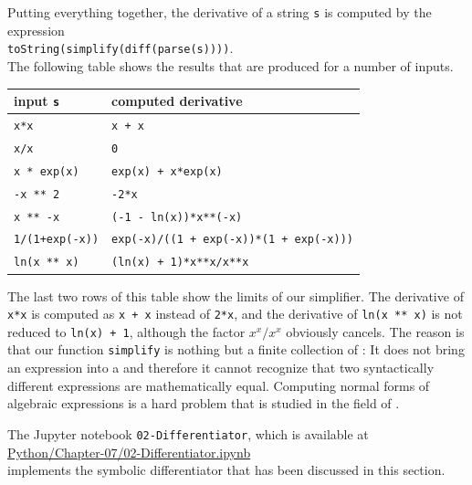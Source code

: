 \noindent
Putting everything together, the derivative of a string \texttt{s} is computed by the expression
\\[0.2cm]
\hspace*{1.3cm}
\texttt{toString(simplify(diff(parse(s))))}.
\\[0.2cm]
The following table shows the results that are produced for a number of inputs.
\begin{center}
\begin{tabular}{|l|l|}
\hline
\textbf{input \texttt{s}} & \textbf{computed derivative} \\
\hline
\texttt{x*x}           & \texttt{x + x}                                        \\
\texttt{x/x}           & \texttt{0}                                            \\
\texttt{x * exp(x)}    & \texttt{exp(x) + x*exp(x)}                            \\
\texttt{-x ** 2}       & \texttt{-2*x}                                         \\
\texttt{x ** -x}       & \texttt{(-1 - ln(x))*x**(-x)}                         \\
\texttt{1/(1+exp(-x))} & \texttt{exp(-x)/((1 + exp(-x))*(1 + exp(-x)))}        \\
\texttt{ln(x ** x)}    & \texttt{(ln(x) + 1)*x**x/x**x}                        \\
\hline
\end{tabular}
\end{center}

\remarkEng
The last two rows of this table show the limits of our simplifier.  The derivative of \texttt{x*x} is
computed as \texttt{x + x} instead of \texttt{2*x}, and the derivative of \texttt{ln(x ** x)} is not
reduced to \texttt{ln(x) + 1}, although the factor $x^x/x^x$ obviously cancels.  The reason is that our
function \texttt{simplify} is nothing but a finite collection of :  It does not bring
an expression into a  and therefore it cannot recognize that two syntactically different
expressions are mathematically equal.  Computing normal forms of algebraic expressions is a hard problem
that is studied in the field of .  \eox

The Jupyter notebook \texttt{02-Differentiator}, which is available at
\\[0.2cm]
\hspace*{1.3cm}
\href{https://github.com/karlstroetmann/Formal-Languages/blob/master/Python/Chapter-07/02-Differentiator.ipynb}{Python/Chapter-07/02-Differentiator.ipynb}
\\[0.2cm]
implements the symbolic differentiator that has been discussed in this section.

